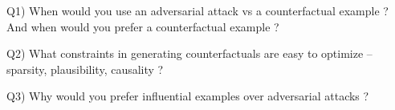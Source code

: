 
Q1) When would you use an adversarial attack vs a counterfactual example ? And when would you prefer a counterfactual example ?

Q2) What constraints in generating counterfactuals are easy to optimize -- sparsity, plausibility, causality ?

Q3) Why would you prefer influential examples over adversarial attacks ?